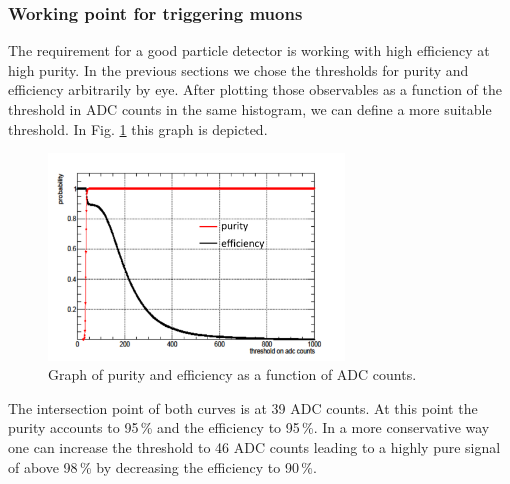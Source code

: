 		\subsubsection{Working point for triggering muons}
		\label{working_point}
			The requirement for a good particle detector is working with high efficiency at high purity.
			In the previous sections we chose the thresholds for purity and efficiency arbitrarily by eye.
			After plotting those observables as a function of the threshold in ADC counts in the same histogram, we can define a more suitable threshold.
			In Fig. \ref{fig:pur_eff} this graph is depicted.
			\begin{figure}[htbp]
				\centering
				\includegraphics[width=0.70\textwidth]{Figures/erdogan/pur_eff.png}
				\caption{Graph of purity and efficiency as a function of ADC counts.}
				\label{fig:pur_eff}
			\end{figure}
			The intersection point of both curves is at 39 ADC counts.
			At this point the purity accounts to 95\,\% and the efficiency to 95\,\%.
			In a more conservative way one can increase the threshold to 46 ADC counts leading to a highly pure signal of above 98\,\% by decreasing the efficiency to 90\,\%.